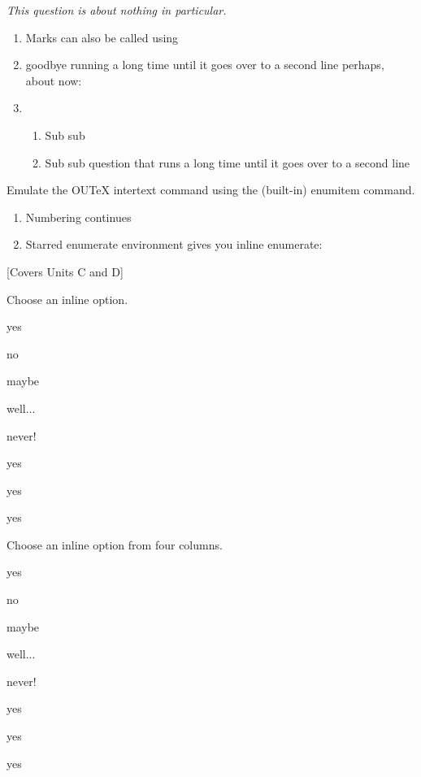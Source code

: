 \documentclass{ouab}
\begin{document}
\emph{This question is about nothing in particular.}
\begin{enumerate}
\item Marks can also be called using 
\item goodbye running a long time until it goes over to a second line perhaps, about now:
\item 
\begin{enumerate}
\item Sub sub
\item Sub sub question that runs a long time until it goes over to a second line
\end{enumerate}
\end{enumerate}
Emulate the OUTeX intertext command using the (built-in) enumitem command.
\begin{enumerate}[resume]
\item Numbering continues
\item Starred enumerate environment gives you inline enumerate:
\end{enumerate}


[Covers Units C and D]

Choose an inline option.

\begin{inlineoptions}{5} %
\item yes
\item no
\item maybe
\item well...
\item never!
\item yes
\item yes
\item yes
\noitem %
\noitem
\end{inlineoptions}

Choose an inline option from four columns.

\begin{inlineoptions}{4} %
\item yes
\item no
\item maybe
\item well...
\item never!
\item yes
\item yes
\item yes
\end{inlineoptions}
\end{document}
